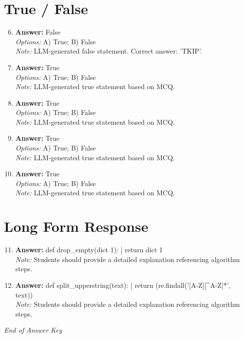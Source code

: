 \documentclass[12pt]{article}
\begin{document}
\section*{True / False}
\begin{enumerate}[label=\arabic*.]
\setcounter{enumi}{5}
\item \textbf{Answer:} False
\\ \textit{Options:} A) True; B) False
\\ \textit{Note:} LLM-generated false statement. Correct answer: 'TKIP'.
\item \textbf{Answer:} True
\\ \textit{Options:} A) True; B) False
\\ \textit{Note:} LLM-generated true statement based on MCQ.
\item \textbf{Answer:} True
\\ \textit{Options:} A) True; B) False
\\ \textit{Note:} LLM-generated true statement based on MCQ.
\item \textbf{Answer:} True
\\ \textit{Options:} A) True; B) False
\\ \textit{Note:} LLM-generated true statement based on MCQ.
\item \textbf{Answer:} True
\\ \textit{Options:} A) True; B) False
\\ \textit{Note:} LLM-generated true statement based on MCQ.
\end{enumerate}

\section*{Long Form Response}
\begin{enumerate}[label=\arabic*.]
\setcounter{enumi}{10}
\item \textbf{Answer:} def drop\_empty(dict 1): | return dict 1
\\ \textit{Note:} Students should provide a detailed explanation referencing algorithm steps.
\item \textbf{Answer:} def split\_upperstring(text): | return (re.findall('[A-Z][^A-Z]*', text))
\\ \textit{Note:} Students should provide a detailed explanation referencing algorithm steps.
\end{enumerate}

\vfill
\noindent\textit{End of Answer Key}
\end{document}
